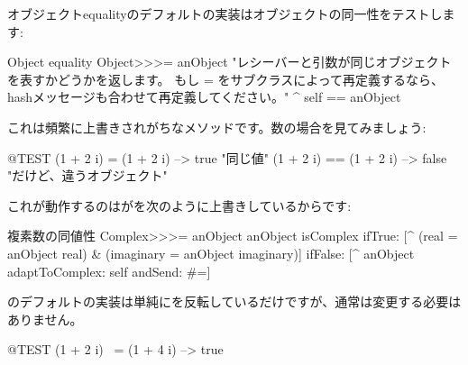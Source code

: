 \documentclass[a4paper,10pt,twoside]{book}
\begin{document}
オブジェクトequalityのデフォルトの実装はオブジェクトの同一性をテストします:
\begin{method}{Object equality}
Object>>>= anObject
    "レシーバーと引数が同じオブジェクトを表すかどうかを返します。
    もし = をサブクラスによって再定義するなら、hashメッセージも合わせて再定義してください。"
    ^ self == anObject
\end{method}

これは頻繁に上書きされがちなメソッドです。数の場合を見てみましょう:

\begin{code}{@TEST}
(1 + 2 i) = (1 + 2 i)   --> true     "同じ値"
(1 + 2 i) == (1 + 2 i) --> false    "だけど、違うオブジェクト"
\end{code}

これが動作するのはが\ct{=}を次のように上書きしているからです:
\begin{method}{複素数の同値性}
Complex>>>= anObject
    anObject isComplex
        ifTrue: [^ (real = anObject real) & (imaginary = anObject imaginary)]
        ifFalse: [^ anObject adaptToComplex: self andSend: #=]
\end{method}

のデフォルトの実装は単純にを反転しているだけですが、通常は変更する必要はありません。

\begin{code}{@TEST}
(1 + 2 i) ~= (1 + 4 i) --> true
\end{code}
\end{document}
